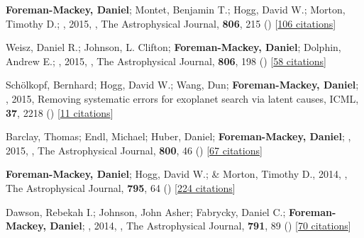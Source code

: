 \item[{\color{numcolor}\scriptsize10}] \textbf{Foreman-Mackey, Daniel}; Montet, Benjamin T.; Hogg, David W.; Morton, Timothy D.; \etal, 2015, , The Astrophysical Journal, \textbf{806}, 215 () [\href{https://ui.adsabs.harvard.edu/abs/2015ApJ...806..215F}{106 citations}]

\item[{\color{numcolor}\scriptsize9}] Weisz, Daniel R.; Johnson, L. Clifton; \textbf{Foreman-Mackey, Daniel}; Dolphin, Andrew E.; \etal, 2015, , The Astrophysical Journal, \textbf{806}, 198 () [\href{https://ui.adsabs.harvard.edu/abs/2015ApJ...806..198W}{58 citations}]

\item[{\color{numcolor}\scriptsize8}] Sch{\"o}lkopf, Bernhard; Hogg, David W.; Wang, Dun; \textbf{Foreman-Mackey, Daniel}; \etal, 2015, Removing systematic errors for exoplanet search via latent causes, ICML, \textbf{37}, 2218 () [\href{https://scholar.google.com/scholar?cites=11768165421845046384}{11 citations}]

\item[{\color{numcolor}\scriptsize7}] Barclay, Thomas; Endl, Michael; Huber, Daniel; \textbf{Foreman-Mackey, Daniel}; \etal, 2015, , The Astrophysical Journal, \textbf{800}, 46 () [\href{https://ui.adsabs.harvard.edu/abs/2015ApJ...800...46B}{67 citations}]

\item[{\color{numcolor}\scriptsize6}] \textbf{Foreman-Mackey, Daniel}; Hogg, David W.; \& Morton, Timothy D., 2014, , The Astrophysical Journal, \textbf{795}, 64 () [\href{https://ui.adsabs.harvard.edu/abs/2014ApJ...795...64F}{224 citations}]

\item[{\color{numcolor}\scriptsize5}] Dawson, Rebekah I.; Johnson, John Asher; Fabrycky, Daniel C.; \textbf{Foreman-Mackey, Daniel}; \etal, 2014, , The Astrophysical Journal, \textbf{791}, 89 () [\href{https://ui.adsabs.harvard.edu/abs/2014ApJ...791...89D}{70 citations}]

